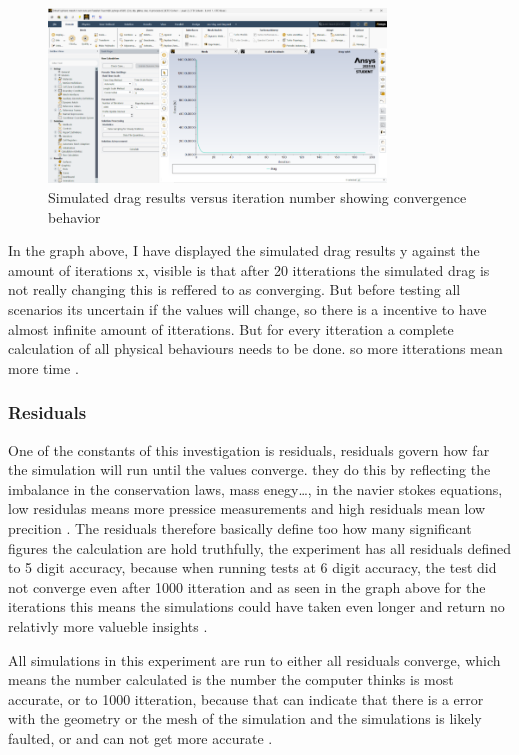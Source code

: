 \documentclass[12pt,a4paper]{article}
\begin{document}
\begin{figure}[H]
    \centering
    \includegraphics[width=0.8\textwidth]{image8.png}
    \caption{Simulated drag results versus iteration number showing convergence behavior}
    \label{fig:convergence}
\end{figure}

In the graph above, I have displayed the simulated drag results y against the amount of iterations x, visible is that after 20 itterations the simulated drag is not really changing this is reffered to as converging. But before testing all scenarios its uncertain if the values will change, so there is a incentive to have almost infinite amount of itterations. But for every itteration a complete calculation of all physical behaviours needs to be done. so more itterations mean more time \cite{blazek2015computational}.

\subsubsection{Residuals}

One of the constants of this investigation is residuals, residuals govern how far the simulation will run until the values converge. they do this by reflecting the imbalance in the conservation laws, mass enegy…, in the navier stokes equations, low residulas means more pressice measurements and high residuals mean low precition \cite{white2015fluid}. The residuals therefore basically define too how many significant figures the calculation are hold truthfully, the experiment has all residuals defined to 5 digit accuracy, because when running tests at 6 digit accuracy, the test did not converge even after 1000 itteration and as seen in the graph above for the iterations this means the simulations could have taken even longer and return no relativly more valueble insights \cite{versteeg2007computational}. 

All simulations in this experiment are run to either all residuals converge, which means the number calculated is the number the computer thinks is most accurate, or to 1000 itteration, because that can indicate that there is a error with the geometry or the mesh of the simulation and the simulations is likely faulted, or and can not get more accurate \cite{ansys2023fluent}.
\end{document}
